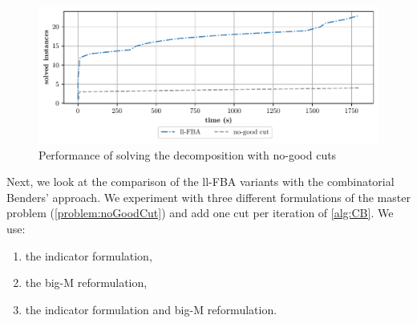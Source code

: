 \begin{figure}[h!]
    \centering
    \includegraphics[width=1.0\textwidth]{Images/no_good_cuts_comparison_plot.pdf}
    \caption{Performance of solving the decomposition with no-good cuts}
    \label{fig:no_good_cuts_comparison_plot}
\end{figure}
\newpage
Next, we look at the comparison of the ll-FBA variants with the combinatorial Benders' approach. We experiment with three different formulations of the master problem (\cref{problem:noGoodCut}) and add one cut per iteration of \cref{alg:CB}. We use:
\begin{enumerate}
    \item the indicator formulation, 
    \item the big-M reformulation, 
    \item the indicator formulation and big-M reformulation.
\end{enumerate}

